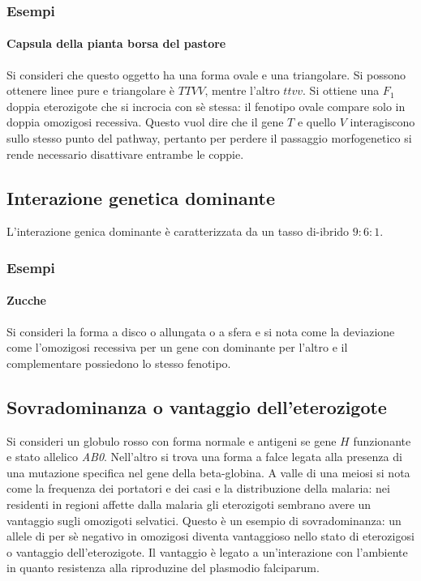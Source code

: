 \subsubsection{Esempi}
\paragraph{Capsula della pianta borsa del pastore}
Si consideri che questo oggetto ha una forma ovale e una triangolare. Si possono ottenere linee pure e triangolare \`e $TTVV$, mentre l'altro $ttvv$. Si ottiene una $F_1$ doppia 
eterozigote che si incrocia con s\`e stessa: il fenotipo ovale compare solo in doppia omozigosi recessiva. Questo vuol dire che il gene $T$ e quello $V$ interagiscono sullo stesso
punto del pathway, pertanto per perdere il passaggio morfogenetico si rende necessario disattivare entrambe le coppie.
\subsection{Interazione genetica dominante}
L'interazione genica dominante \`e caratterizzata da un tasso di-ibrido $9:6:1$. 
\subsubsection{Esempi}
\paragraph{Zucche} 
Si consideri la forma a disco o allungata o a sfera e si nota come la deviazione come l'omozigosi recessiva per un gene con dominante per l'altro e il complementare possiedono lo 
stesso fenotipo. 
\subsection{Sovradominanza o vantaggio dell'eterozigote}
Si consideri un globulo rosso con forma normale e antigeni se gene $H$ funzionante e stato allelico \emph{AB0}. Nell'altro si trova una forma a falce legata alla presenza di una
mutazione specifica nel gene della beta-globina. A valle di una meiosi si nota come la frequenza dei portatori e dei casi e la distribuzione della malaria: nei residenti in regioni
affette dalla malaria gli eterozigoti sembrano avere un vantaggio sugli omozigoti selvatici. Questo \`e un esempio di sovradominanza: un allele di per s\`e negativo in omozigosi 
diventa vantaggioso nello stato di eterozigosi o vantaggio dell'eterozigote. Il vantaggio \`e legato a un'interazione con l'ambiente in quanto resistenza alla riproduzine del 
plasmodio falciparum. 
